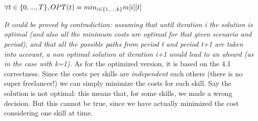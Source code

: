 $\newline \forall t \in \{0,..., T\}, OPT(t) = min_{i \in \{1,...,k\}} m[i][t]  \newline$

\textit{It could be proved by contradiction: assuming that until iteration i the solution is optimal (and also all the minimum costs are optimal for that given scenario and period), and that all the possible paths from period t and period t+1 are taken into account, a non optimal solution at iteration i+1 would lead to an absurd (as in the case with k=1).}
As for the optimized version, it is based on the 4.1 correctness. Since the costs per skills are \textit{independent} each others (there is no super freelancer!) we can simply minimize the costs for each skill. Say the solution is not optimal: this means that, for some skills, we made a wrong decision. But this cannot be true, since we have actually minimized the cost considering one skill at time.